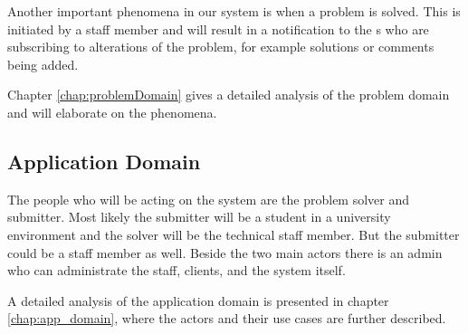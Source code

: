Another important phenomena in our system is when a problem is solved.
This is initiated by a staff member and will result in a notification to the \aclient s who are subscribing to alterations of the problem, for example solutions or comments being added.

Chapter \ref{chap:problemDomain} gives a detailed analysis of the problem domain and will elaborate on the phenomena.

\subsection{Application Domain}
The people who will be acting on the system are the problem solver and submitter. Most likely the submitter will be a student in a university environment and the solver will be the technical staff member. But the submitter could be a staff member as well. Beside the two main actors there is an admin who can administrate the staff, clients, and the system itself.

A detailed analysis of the application domain is presented in chapter \ref{chap:app_domain}, where the actors and their use cases are further described.